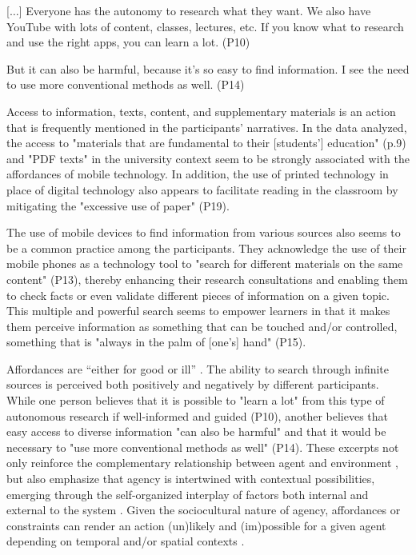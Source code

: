 [$\ldots$] Everyone has the autonomy to research what they want. We also have YouTube with lots of content, classes, lectures, etc. If you know what to research and use the right apps, you can learn a lot. (P10)

But it can also be harmful, because it's so easy to find information. I see the need to use more conventional methods as well. (P14)

Access to information, texts, content, and supplementary materials is an action that is frequently mentioned in the participants' narratives. In the data analyzed, the access to "materials that are fundamental to their [students'] education" (p.9) and "PDF texts" in the university context seem to be strongly associated with the affordances of mobile technology. In addition, the use of printed technology in place of digital technology also appears to facilitate reading in the classroom by mitigating the "excessive use of paper" (P19).

The use of mobile devices to find information from various sources also seems to be a common practice among the participants. They acknowledge the use of their mobile phones as a technology tool to "search for different materials on the same content" (P13), thereby enhancing their research consultations and enabling them to check facts or even validate different pieces of information on a given topic. This multiple and powerful search seems to empower learners in that it makes them perceive information as something that can be touched and/or controlled, something that is "always in the palm of [one’s] hand" (P15).

Affordances are “either for good or ill” \cite[p. 127]{gibson1986}. The ability to search through infinite sources is perceived both positively and negatively by different participants. While one person believes that it is possible to "learn a lot" from this type of autonomous research if well-informed and guided (P10), another believes that easy access to diverse information "can also be harmful" and that it would be necessary to "use more conventional methods as well" (P14). These excerpts not only reinforce the complementary relationship between agent and environment \cite{gibson1986}, but also emphasize that agency is intertwined with contextual possibilities, emerging through the self-organized interplay of factors both internal and external to the system \cite{larsen2019}. Given the sociocultural nature of agency, affordances or constraints can render an action (un)likely and (im)possible for a given agent depending on temporal and/or spatial contexts \cite{lantolf2006}.


